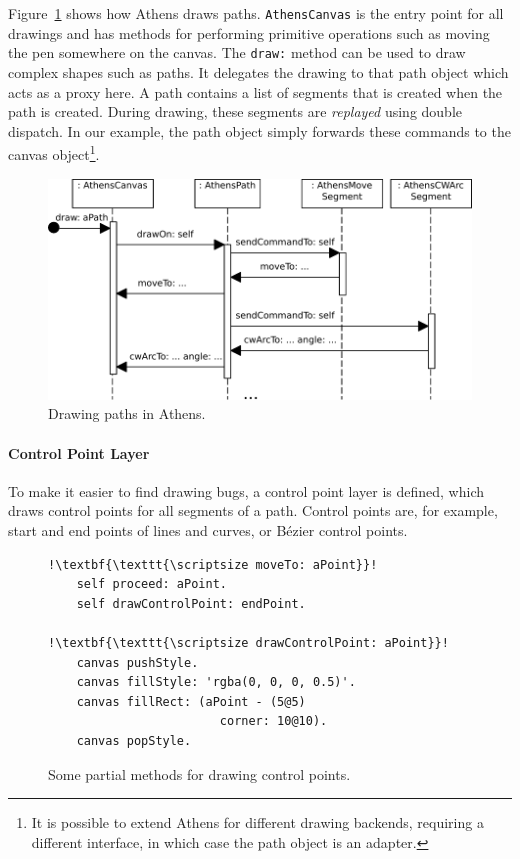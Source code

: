 \documentclass{sig-alternate}
\begin{document}
Figure~\ref{fig:athens_sequence} shows how Athens draws paths. \texttt{AthensCanvas} is the entry point for all drawings and has methods for performing primitive operations such as moving the pen somewhere on the canvas. The \texttt{draw:} method can be used to draw complex shapes such as paths. It delegates the drawing to that path object which acts as a proxy here. A path contains a list of segments that is created when the path is created. During drawing, these segments are
\emph{replayed} using double dispatch. In our example, the path object simply forwards these commands to the canvas object\footnote{It is possible to extend Athens for different drawing backends, requiring a different interface, in which case the path object is an adapter.}.
\begin{figure}[!htp]
    \includegraphics[width=\columnwidth]{athens_sequence.pdf}
    \caption{Drawing paths in Athens.}
    \label{fig:athens_sequence}
\end{figure}

\paragraph{Control Point Layer}
To make it easier to find drawing bugs, a control point layer is defined, which draws control points for all segments of a path. Control points are, for example, start and end points of lines and curves, or Bézier control points.

\begin{figure}[!htp]
\begin{lstlisting}[escapechar=!]
!\textbf{\texttt{\scriptsize moveTo: aPoint}}!
    self proceed: aPoint.
    self drawControlPoint: endPoint.

!\textbf{\texttt{\scriptsize drawControlPoint: aPoint}}!
    canvas pushStyle.
    canvas fillStyle: 'rgba(0, 0, 0, 0.5)'.
    canvas fillRect: (aPoint - (5@5) 
                        corner: 10@10).
    canvas popStyle.
\end{lstlisting}
\caption{Some partial methods for drawing control points.}
\label{fig:athens_partial}
\end{figure}
\end{document}

